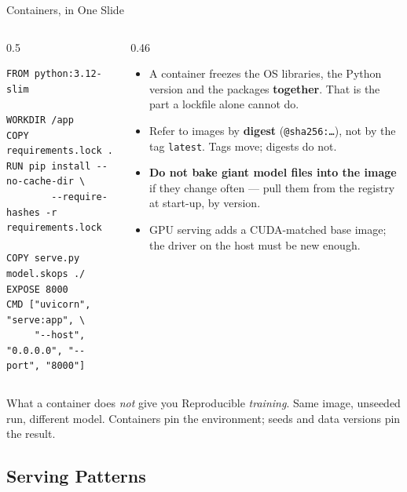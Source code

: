 
\begin{frame}[fragile]{Containers, in One Slide}

    \begin{columns}[T]
        \begin{column}{0.5\textwidth}
            \begin{lstlisting}[basicstyle=\ttfamily\scriptsize]
FROM python:3.12-slim

WORKDIR /app
COPY requirements.lock .
RUN pip install --no-cache-dir \
        --require-hashes -r requirements.lock

COPY serve.py model.skops ./
EXPOSE 8000
CMD ["uvicorn", "serve:app", \
     "--host", "0.0.0.0", "--port", "8000"]
            \end{lstlisting}
        \end{column}
        \begin{column}{0.46\textwidth}
            \small
            \begin{itemize}
                \setlength\itemsep{0.4em}
                \item A container freezes the OS libraries, the Python version and the packages
                      \textbf{together}. That is the part a lockfile alone cannot do.
                \item Refer to images by \textbf{digest} (\texttt{@sha256:\ldots}), not by the tag
                      \texttt{latest}. Tags move; digests do not.
                \item \textbf{Do not bake giant model files into the image} if they change often --- pull them
                      from the registry at start-up, by version.
                \item GPU serving adds a CUDA-matched base image; the driver on the host must be new enough.
            \end{itemize}
        \end{column}
    \end{columns}

    \vspace{0.6em}
    \begin{block}{What a container does \emph{not} give you}
        Reproducible \emph{training}. Same image, unseeded run, different model. Containers pin the
        environment; seeds and data versions pin the result.
    \end{block}

\end{frame}

\subsection{Serving Patterns}
